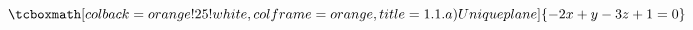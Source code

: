 \documentclass{article}
\begin{document}
\begin{equation}
\tcboxmath[colback=orange!25!white,colframe=orange,title=1.1.a) Unique plane]
{ -2x +y -3z + 1 = 0 }
\end{equation}

%
%
%
%
%
%
%
%
%
\end{document}
